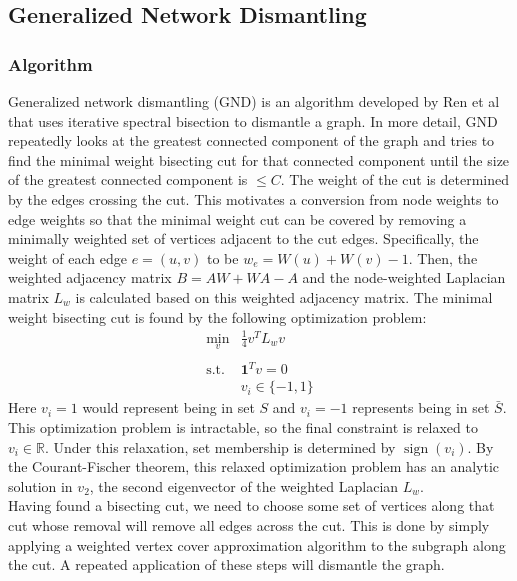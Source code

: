 \documentclass{article}
\DeclareMathOperator{\sign}{sign}
\begin{document}
\subsection{Generalized Network Dismantling}
\subsubsection{Algorithm}
Generalized network dismantling (GND) is an algorithm developed by Ren et al \cite{gnd} that uses iterative spectral bisection to dismantle a graph. 
In more detail, GND repeatedly looks at the greatest connected component of the graph and tries to find the minimal weight bisecting cut for that connected component until the size of the greatest connected component is $\leq C$. 
The weight of the cut is determined by the edges crossing the cut. 
This motivates a conversion from node weights to edge weights so that the minimal weight cut can be covered by removing a minimally weighted set of vertices adjacent to the cut edges. 
Specifically, the weight of each edge $e = (u,v)$ to be $w_e = W(u) + W(v) - 1$. Then, the weighted adjacency matrix $B = AW + WA - A$ and the node-weighted Laplacian matrix $L_w$ is calculated based on this weighted adjacency matrix. 
The minimal weight bisecting cut is found by the following optimization problem:
$$\begin{array}{cc}
    \min_v & \frac{1}{4}v^TL_wv \\
     & \\
    \text{s.t.} & \mathbf{1}^Tv = 0 \\
     & v_i \in \{-1, 1\}
\end{array}$$
Here $v_i = 1$ would represent being in set $S$ and $v_i = -1$ represents being in set $\bar{S}$. 
This optimization problem is intractable, so the final constraint is relaxed to $v_i \in \mathbb{R}$. 
Under this relaxation, set membership is determined by $\sign(v_i)$. 
By the Courant-Fischer theorem, this relaxed optimization problem has an analytic solution in $v_2$, the second eigenvector of the weighted Laplacian $L_w$. \\

Having found a bisecting cut, we need to choose some set of vertices along that cut whose removal will remove all edges across the cut. 
This is done by simply applying a weighted vertex cover approximation algorithm to the subgraph along the cut. 
A repeated application of these steps will dismantle the graph.
\end{document}
